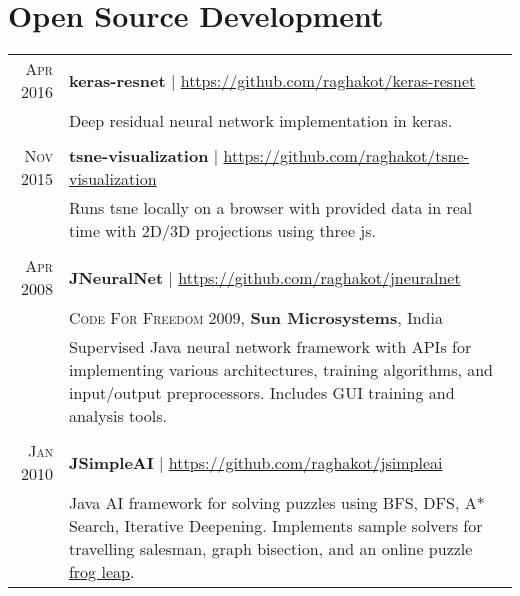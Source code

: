 \documentclass[a4paper,11pt]{article}
\begin{document}
\section{Open Source Development}
\begin{longtable}{r|p{12.5cm}}
\textsc{Apr 2016} & \normalsize \textbf{keras-resnet} | \href{https://github.com/raghakot/keras-resnet}{https://github.com/raghakot/keras-resnet} \\
& \footnotesize{ \begin{minipage}[t]{12.5cm} Deep residual neural network implementation in keras.
 \end{minipage}}
  \\
 \multicolumn{2}{c}{}
 \\
\textsc{Nov 2015} & \normalsize \textbf{tsne-visualization} | \href{https://github.com/raghakot/tsne-visualization}{https://github.com/raghakot/tsne-visualization} \\
& \footnotesize{ \begin{minipage}[t]{12.5cm} Runs tsne locally on a browser with provided data in real time with 2D/3D projections using three js.
 \end{minipage}}
  \\
 \multicolumn{2}{c}{}
 \\
 \textsc{Apr 2008} & \textbf{JNeuralNet} | \href{https://github.com/raghakot/jneuralnet}{https://github.com/raghakot/jneuralnet} \\
 & \textsc{Code For Freedom 2009}, \small \textbf{Sun Microsystems}, India \\
 & \footnotesize{ \begin{minipage}[t]{12.5cm}
 Supervised Java neural network framework with APIs for implementing various architectures, training algorithms, and input/output preprocessors. Includes GUI training and analysis tools.
 \end{minipage}}
 \\
 \multicolumn{2}{c}{}
 \\
 \textsc{Jan 2010} & \normalsize \textbf{JSimpleAI} | \href{https://github.com/raghakot/jsimpleai}{https://github.com/raghakot/jsimpleai} \\
& \footnotesize{ \begin{minipage}[t]{12.5cm} Java AI framework for solving puzzles using BFS, DFS, A* Search, Iterative Deepening. Implements sample solvers for travelling salesman, graph bisection, and an online puzzle \href{http://www.justriddlesandmore.com/frogleap.html}{frog leap}.
 \end{minipage}}\\
\end{longtable}
\end{document}
